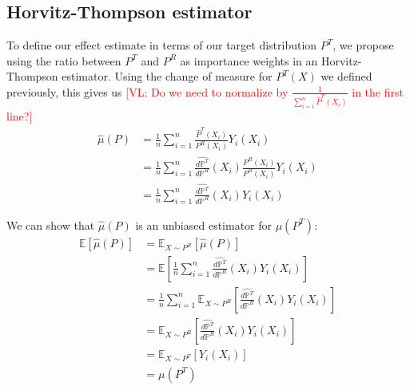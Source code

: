 \documentclass{article}
\newcommand{\vl}[1]{\textcolor{red}{[VL: #1]}}
\begin{document}
\subsection{Horvitz-Thompson estimator}

To define our effect estimate in terms of our target distribution $P^T$, we propose using the ratio between $P^T$ and $P^R$ as importance weights in an Horvitz-Thompson estimator. Using the change of measure for $P^T(X)$ we defined previously, this gives us \vl{Do we need to normalize by $\frac{1}{\sum_{i=1}^n \hat{P}^T(X_i)}$ in the first line?}
\begin{align*}
    \hat{\mu}(P) &= \frac{1}{n} \sum_{i=1}^n \frac{\hat{P}^T(X_i)}{P^R(X_i)}Y_i(X_i) \\
    &= \frac{1}{n} \sum_{i=1}^n \frac{\hat{d \mathbb{P}^T}}{d \mathbb{P}^R}(X_i)\frac{P^R(X_i)}{P^R(X_i)} Y_i(X_i) \\
    &=\boxed{\frac{1}{n} \sum_{i=1}^n \frac{\hat{d \mathbb{P}^T}}{d \mathbb{P}^R}(X_i)Y_i(X_i)}
\end{align*}

We can show that $\hat{\mu}(P)$ is an unbiased estimator for $\mu(P^T)$:
\begin{align*}
    \mathbb{E}[\hat{\mu}(P)] &= \mathbb{E}_{X \sim P^R}[\hat{\mu}(P)] \\
    &= \mathbb{E}\left[\frac{1}{n} \sum_{i=1}^n \frac{\hat{d \mathbb{P}^T}}{d \mathbb{P}^R}(X_i)Y_i(X_i)\right] \\
    &=\frac{1}{n}\sum_{i=1}^n \mathbb{E}_{X \sim P^R}\left[\frac{\hat{d \mathbb{P}^T}}{d \mathbb{P}^R}(X_i)Y_i(X_i)\right] \\
    &= \mathbb{E}_{X \sim P^R}\left[\frac{\hat{d \mathbb{P}^T}}{d \mathbb{P}^R}(X_i)Y_i(X_i)\right] \\
    &=\mathbb{E}_{X \sim P^T}[Y_i(X_i)] \\
    &= \mu(P^T)
\end{align*}
\end{document}

